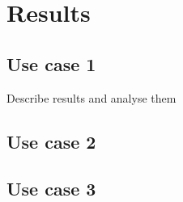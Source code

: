 
\chapter{Results}

\section{Use case 1}
Describe results and analyse them



\section{Use case 2}

\section{Use case 3}
